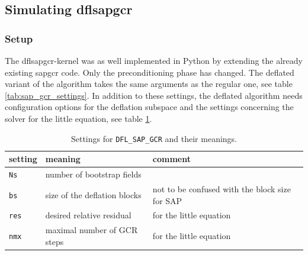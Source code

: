 \documentclass{article}
\theoremstyle{plain} %
\theoremstyle{convention} %
\theoremstyle{remark} %
\def\code#1{\texttt{#1}}
\numberwithin{equation}{section}
\begin{document}
\subsection{Simulating \acrshort*{dflsapgcr}}

\label{sec:dfl_sap_gcr_results}

\subsubsection{Setup}

The \acrshort{dflsapgcr}-kernel was as well implemented in Python by extending the already existing \acrshort{sapgcr} code. Only the preconditioning phase has changed. The deflated variant of the algorithm takes the same arguments as the regular one, see table \ref{tab:sap_gcr_settings}. In addition to these settings, the deflated algorithm needs configuration options for the deflation subspace and the settings concerning the solver for the little equation, see table \ref{tab:dfl_sap_gcr_settings}.

\begin{table}[H]
\centering
    \begin{tabular}{ |p{1.5cm}|p{6cm}|p{4.5cm}|  }
        \hline
        setting & meaning & comment \\
        \hline\hline
        \code{Ns}  & number of bootstrap fields & \\
        \hline
        \code{bs}  & size of the deflation blocks & not to be confused with the block size for SAP \\
        \hline
        \code{res}  & desired relative residual & for the little equation \\
        \hline
        \code{nmx}  & maximal number of GCR steps & for the little equation \\
        \hline
    \end{tabular}
    \caption{Settings for \code{DFL\_SAP\_GCR} and their meanings.}
    \label{tab:dfl_sap_gcr_settings}
\end{table}
\end{document}
